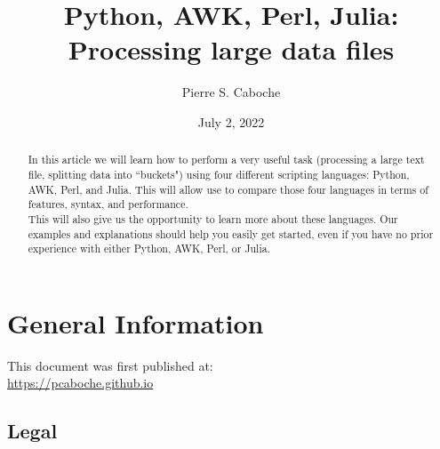\documentclass[twoside]{article}
\title{Python, AWK, Perl, Julia: \\ Processing large data files}
\author{Pierre S. Caboche}
\date{
	July 2, 2022
}
\begin{document}
	
	\maketitle
	
	\begin{abstract}
		In this article we will learn how to perform a very useful task (processing a large text file, splitting data into ``buckets") using four different scripting languages: Python, AWK, Perl, and Julia.
		This will allow use to compare those four languages in terms of features, syntax, and performance. \\
		
		This will also give us the opportunity to learn more about these languages. Our examples and explanations should help you easily get started, even if you have no prior experience with either Python, AWK, Perl, or Julia.
	\end{abstract}


\bigskip
\bigskip
\bigskip




\newpage
\section*{General Information}

This document was first published at: \\
\mbox{} \hfill \url{https://pcaboche.github.io} 

\subsection*{Legal}


\newpage
\renewcommand{\currentPart}{Table of Contents}

\setcounter{tocdepth}{3}
\tableofcontents

\newpage


\newpage


\newpage


\newpage


\newpage


\newpage


\newpage


\newpage


\newpage


\bigskip


\newpage
\renewcommand{\formatPartTitle}{}




\bigskip
\bigskip

\listoffigures
\listoftables


\label{LastPage}
\end{document}
